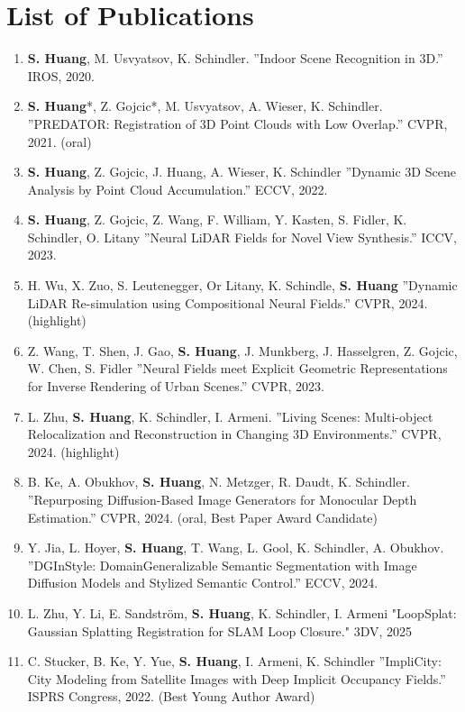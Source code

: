 
\chapter{List of Publications}
\label{chap:pub}

\begin{enumerate}
    \item \textbf{\textbf{S. Huang}}, M. Usvyatsov, K. Schindler. ”Indoor Scene Recognition in 3D.” IROS, 2020.
    \item \textbf{S. Huang}*, Z. Gojcic*, M. Usvyatsov, A. Wieser, K. Schindler. ”PREDATOR: Registration of 3D Point Clouds with Low Overlap.” CVPR, 2021. (oral)
    \item \textbf{S. Huang}, Z. Gojcic, J. Huang, A. Wieser, K. Schindler ”Dynamic 3D Scene Analysis by Point Cloud Accumulation.” ECCV, 2022.
    \item \textbf{S. Huang}, Z. Gojcic, Z. Wang, F. William, Y. Kasten, S. Fidler, K. Schindler, O. Litany ”Neural LiDAR Fields for Novel View Synthesis.” ICCV, 2023.
    \item H. Wu, X. Zuo, S. Leutenegger, Or Litany, K. Schindle, \textbf{S. Huang} ”Dynamic LiDAR Re-simulation using Compositional Neural Fields.” CVPR, 2024. (highlight)
    \item Z. Wang, T. Shen, J. Gao, \textbf{S. Huang}, J. Munkberg, J. Hasselgren, Z. Gojcic, W. Chen, S. Fidler ”Neural Fields meet Explicit Geometric Representations for Inverse Rendering of Urban Scenes.” CVPR, 2023.
    \item L. Zhu, \textbf{S. Huang}, K. Schindler, I. Armeni. ”Living Scenes: Multi-object Relocalization and Reconstruction in Changing 3D Environments.” CVPR, 2024. (highlight)
    \item B. Ke, A. Obukhov, \textbf{S. Huang}, N. Metzger, R. Daudt, K. Schindler. ”Repurposing Diﬀusion-Based Image Generators for Monocular Depth Estimation.” CVPR, 2024. (oral, Best Paper Award Candidate)
    \item Y. Jia, L. Hoyer, \textbf{S. Huang}, T. Wang, L. Gool, K. Schindler, A. Obukhov. ”DGInStyle: DomainGeneralizable Semantic Segmentation with Image Diﬀusion Models and Stylized Semantic Control.” ECCV, 2024.
    \item L. Zhu, Y. Li, E. Sandström, \textbf{S. Huang}, K. Schindler, I. Armeni "LoopSplat: Gaussian Splatting Registration for SLAM Loop Closure." 3DV, 2025
    \item C. Stucker, B. Ke, Y. Yue, \textbf{S. Huang}, I. Armeni, K. Schindler ”ImpliCity: City Modeling from Satellite Images with Deep Implicit Occupancy Fields.” ISPRS Congress, 2022. (Best Young Author Award)

\end{enumerate}
